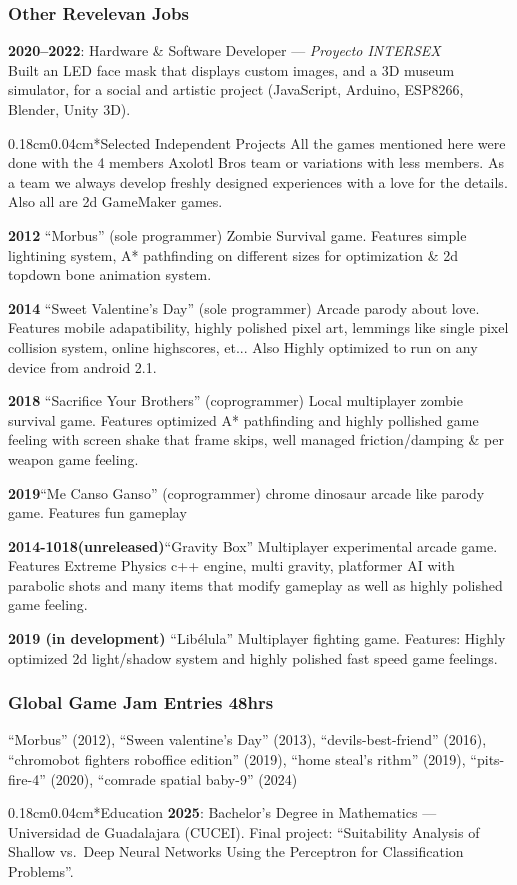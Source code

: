 \documentclass[10.5pt]{article}
\makeatletter
\renewcommand{\section}{\@startsection{section}{1}{0pt}%
  {0.18cm}{0.04cm}{\normalfont\large\bfseries}}
\makeatother
\begin{document}
\subsubsection*{Other Revelevan Jobs}
\textbf{2020--2022}: Hardware \& Software Developer --- \textit{Proyecto INTERSEX} \\
Built an LED face mask that displays custom images, and a 3D museum simulator, for a social and artistic project (JavaScript, Arduino, ESP8266, Blender, Unity 3D).

\section*{Selected Independent Projects}
All the games mentioned here were done with the 4 members Axolotl Bros team or variations with less members. As a team we always develop freshly designed experiences with a love for the details. Also all are 2d GameMaker games.

\textbf{2012} ``Morbus'' (sole programmer) Zombie Survival game. Features simple lightining system, A* pathfinding on different sizes for optimization & 2d topdown bone animation system.

\textbf{2014} ``Sweet Valentine's Day'' (sole programmer) Arcade parody about love. Features mobile adapatibility, highly polished pixel art, lemmings like single pixel collision system, online highscores, et... Also Highly optimized to run on any device from android 2.1.

\textbf{2018} ``Sacrifice Your Brothers'' (coprogrammer) Local multiplayer zombie survival game. Features optimized A* pathfinding and highly pollished game feeling with screen shake that frame skips, well managed friction/damping & per weapon game feeling.

\textbf{2019}``Me Canso Ganso'' (coprogrammer) chrome dinosaur arcade like parody game. Features fun gameplay

\textbf{2014-1018(unreleased)}``Gravity Box'' Multiplayer experimental arcade game. Features Extreme Physics c++ engine, multi gravity, platformer AI with parabolic shots and many items that modify gameplay as well as highly polished game feeling.

\textbf{2019 (in development)} ``Libélula'' Multiplayer fighting game. Features: Highly optimized 2d light/shadow system and highly polished fast speed game feelings.

\subsubsection* { Global Game Jam Entries 48hrs}
``Morbus'' (2012), ``Sween valentine's Day'' (2013), ``devils-best-friend'' (2016), ``chromobot fighters roboffice edition'' (2019), ``home steal's rithm'' (2019), ``pits-fire-4'' (2020), ``comrade spatial baby-9'' (2024)

\section*{Education}
\textbf{2025}: Bachelor's Degree in Mathematics --- Universidad de Guadalajara (CUCEI). Final project: ``Suitability Analysis of Shallow vs.\ Deep Neural Networks Using the Perceptron for Classification Problems''.
\end{document}
